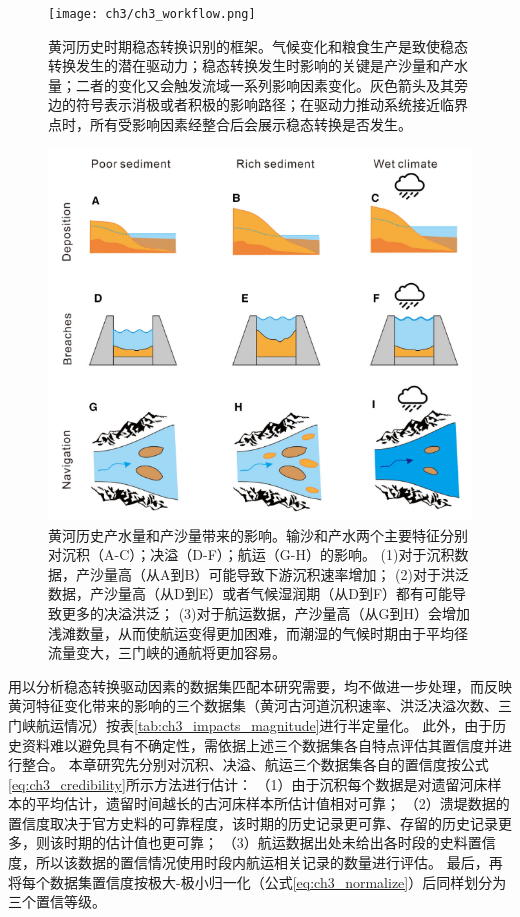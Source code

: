 \begin{figure}[htb] %
    \centering
    \texttt{[image: ch3/ch3\_workflow.png]}
    \caption[黄河历史时期稳态转换识别的框架]{黄河历史时期稳态转换识别的框架。气候变化和粮食生产是致使稳态转换发生的潜在驱动力；稳态转换发生时影响的关键是产沙量和产水量；二者的变化又会触发流域一系列影响因素变化。灰色箭头及其旁边的符号表示消极或者积极的影响路径；在驱动力推动系统接近临界点时，所有受影响因素经整合后会展示稳态转换是否发生。}
    \label{fig:ch3:regime_shift_detect}
\end{figure}

\begin{figure}[htb] %
    \centering
    \includegraphics[width=\textwidth]{img/ch3/ch3_impacts_diagram.png}
    \caption[黄河历史产水量和产沙量带来的影响]{黄河历史产水量和产沙量带来的影响。输沙和产水两个主要特征分别对沉积（A-C）；决溢（D-F）；航运（G-H）的影响。
    (1)对于沉积数据，产沙量高（从A到B）可能导致下游沉积速率增加\cite{xu2003a}；
    (2)对于洪泛数据，产沙量高（从D到E）或者气候湿润期（从D到F）都有可能导致更多的决溢洪泛\cite{chen2012}；
    (3)对于航运数据，产沙量高（从G到H）会增加浅滩数量，从而使航运变得更加困难，而潮湿的气候时期由于平均径流量变大，三门峡的通航将更加容易\cite{WangShouChun1993}。}
    \label{fig:ch3:impacts_diagram}
\end{figure}

用以分析稳态转换驱动因素的数据集匹配本研究需要，均不做进一步处理，而反映黄河特征变化带来的影响的三个数据集（黄河古河道沉积速率、洪泛决溢次数、三门峡航运情况）按表\ref{tab:ch3_impacts_magnitude}进行半定量化。
此外，由于历史资料难以避免具有不确定性，需依据上述三个数据集各自特点评估其置信度并进行整合。
本章研究先分别对沉积、决溢、航运三个数据集各自的置信度按公式\ref{eq:ch3_credibility}所示方法进行估计：
（1）由于沉积每个数据是对遗留河床样本的平均估计，遗留时间越长的古河床样本所估计值相对可靠；
（2）溃堤数据的置信度取决于官方史料的可靠程度，该时期的历史记录更可靠、存留的历史记录更多，则该时期的估计值也更可靠；
（3）航运数据出处未给出各时段的史料置信度，所以该数据的置信情况使用时段内航运相关记录的数量进行评估。
最后，再将每个数据集置信度按极大-极小归一化（公式\ref{eq:ch3_normalize}）后同样划分为三个置信等级。

